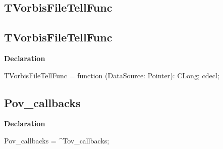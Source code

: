 \documentclass{report}
\newif\ifpdf
\begin{document}
\subsection*{\large{\textbf{TVorbisFileTellFunc}}\normalsize\hspace{1ex}\hrulefill}
\else
\subsection*{TVorbisFileTellFunc}
\fi
\label{ok_vorbisfile-TVorbisFileTellFunc}
\begin{list}{}{
\setlength{\itemindent}{0cm}
\setlength{\listparindent}{0cm}
\setlength{\leftmargin}{\evensidemargin}
\addtolength{\leftmargin}{\tmplength}
\settowidth{\labelsep}{X}
\addtolength{\leftmargin}{\labelsep}
\setlength{\labelwidth}{\tmplength}
}
\item[\textbf{Declaration}\hfill]
\ifpdf
\begin{flushleft}
\fi
\begin{ttfamily}
TVorbisFileTellFunc = function (DataSource: Pointer): CLong; cdecl;\end{ttfamily}

\ifpdf
\end{flushleft}
\fi

\end{list}
\ifpdf
\subsection*{\large{\textbf{Pov{\_}callbacks}}\normalsize\hspace{1ex}\hrulefill}
\else
\subsection*{Pov{\_}callbacks}
\fi
\label{ok_vorbisfile-Pov_callbacks}
\begin{list}{}{
\setlength{\itemindent}{0cm}
\setlength{\listparindent}{0cm}
\setlength{\leftmargin}{\evensidemargin}
\addtolength{\leftmargin}{\tmplength}
\settowidth{\labelsep}{X}
\addtolength{\leftmargin}{\labelsep}
\setlength{\labelwidth}{\tmplength}
}
\item[\textbf{Declaration}\hfill]
\ifpdf
\begin{flushleft}
\fi
\begin{ttfamily}
Pov{\_}callbacks = {\^{}}Tov{\_}callbacks;\end{ttfamily}

\ifpdf
\end{flushleft}
\fi

\end{list}
\ifpdf
\end{document}
